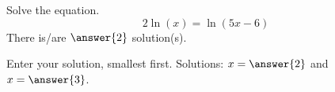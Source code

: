 \documentclass{ximera}
\author{Bobby Ramsey}
\begin{document}
\begin{exercise}
	Solve the equation.
	\[ 2\ln(x) = \ln(5x-6) \]
	There is/are $\answer{2}$ solution(s).
	\begin{exercise}
		Enter your solution, smallest first.
		Solutions: $x = \answer{ 2 }$ and $x = \answer{3}$.
	\end{exercise}
\end{exercise}
\end{document}
